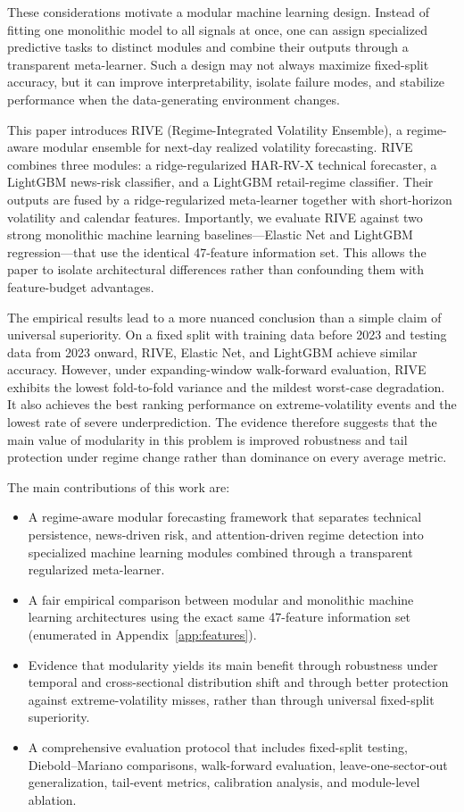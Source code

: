 \documentclass[review]{elsarticle}
\begin{document}
These considerations motivate a modular machine learning design. Instead of fitting one monolithic model to all signals at once, one can assign specialized predictive tasks to distinct modules and combine their outputs through a transparent meta-learner. Such a design may not always maximize fixed-split accuracy, but it can improve interpretability, isolate failure modes, and stabilize performance when the data-generating environment changes.

This paper introduces RIVE (Regime-Integrated Volatility Ensemble), a regime-aware modular ensemble for next-day realized volatility forecasting. RIVE combines three modules: a ridge-regularized HAR-RV-X technical forecaster, a LightGBM news-risk classifier, and a LightGBM retail-regime classifier. Their outputs are fused by a ridge-regularized meta-learner together with short-horizon volatility and calendar features. Importantly, we evaluate RIVE against two strong monolithic machine learning baselines---Elastic Net and LightGBM regression---that use the identical 47-feature information set. This allows the paper to isolate architectural differences rather than confounding them with feature-budget advantages.

The empirical results lead to a more nuanced conclusion than a simple claim of universal superiority. On a fixed split with training data before 2023 and testing data from 2023 onward, RIVE, Elastic Net, and LightGBM achieve similar accuracy. However, under expanding-window walk-forward evaluation, RIVE exhibits the lowest fold-to-fold variance and the mildest worst-case degradation. It also achieves the best ranking performance on extreme-volatility events and the lowest rate of severe underprediction. The evidence therefore suggests that the main value of modularity in this problem is improved robustness and tail protection under regime change rather than dominance on every average metric.

The main contributions of this work are:
\begin{itemize}
    \item A regime-aware modular forecasting framework that separates technical persistence, news-driven risk, and attention-driven regime detection into specialized machine learning modules combined through a transparent regularized meta-learner.
    \item A fair empirical comparison between modular and monolithic machine learning architectures using the exact same 47-feature information set (enumerated in Appendix~\ref{app:features}).
    \item Evidence that modularity yields its main benefit through robustness under temporal and cross-sectional distribution shift and through better protection against extreme-volatility misses, rather than through universal fixed-split superiority.
    \item A comprehensive evaluation protocol that includes fixed-split testing, Diebold--Mariano comparisons, walk-forward evaluation, leave-one-sector-out generalization, tail-event metrics, calibration analysis, and module-level ablation.
\end{itemize}
\end{document}
